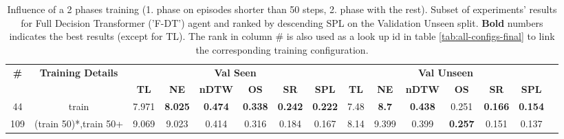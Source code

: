 \begin{table}
\centering
\caption{\label{tab:f_dt_split_training_50}Influence of a 2 phases training (1. phase on episodes shorter than 50 steps, 2. phase with the rest). Subset of experiments' results for Full Decision Transformer ('F-DT') agent and ranked by descending SPL on the Validation Unseen split. \textbf{Bold} numbers indicates the best results (except for TL). The rank in column \# is also used as a look up id in table \ref{tab:all-configs-final} to link the corresponding training configuration.}
\begin{tabular}{@{\hskip3pt}c@{\hskip3pt}c@{\hskip3pt}c@{\hskip3pt}c@{\hskip3pt}c@{\hskip3pt}c@{\hskip3pt}c@{\hskip3pt}c@{\hskip3pt}c@{\hskip3pt}c@{\hskip3pt}c@{\hskip3pt}c@{\hskip3pt}c@{\hskip3pt}c@{\hskip3pt}c}
\toprule
                                  \textbf{\#} & \textbf{Training Details} & \multicolumn{6}{c}{\textbf{Val Seen}} & \multicolumn{6}{c}{\textbf{Val Unseen}} \\
\cmidrule(l){3-8}\cmidrule(l){9-14}\textbf{~} &                \textbf{~} &       \textbf{TL} &     \textbf{NE} &   \textbf{nDTW} &     \textbf{OS} &     \textbf{SR} &    \textbf{SPL} &         \textbf{TL} &   \textbf{NE} &   \textbf{nDTW} &     \textbf{OS} &     \textbf{SR} &    \textbf{SPL} \\
\midrule
                                           44 &                     train &             7.971 &  \textbf{8.025} &  \textbf{0.474} &  \textbf{0.338} &  \textbf{0.242} &  \textbf{0.222} &                7.48 &  \textbf{8.7} &  \textbf{0.438} &           0.251 &  \textbf{0.166} &  \textbf{0.154} \\
                                          109 &     (train 50)*,train 50+ &             9.069 &           9.023 &           0.414 &           0.316 &           0.184 &           0.167 &                8.14 &         9.399 &           0.399 &  \textbf{0.257} &           0.151 &           0.137 \\
\bottomrule
\end{tabular}
\end{table}
